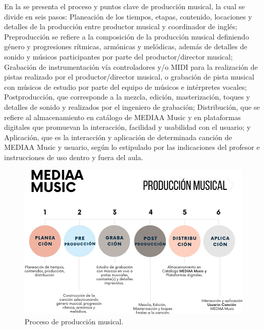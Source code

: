 \documentclass[spanish]{textolivre}
\begin{document}
En la  se presenta el proceso y puntos clave de producción musical, la cual se divide en seis pasos: Planeación de los tiempos, etapas, contenido, locaciones y detalles de la producción entre productor musical y coordinador de inglés; Preproducción se refiere a la composición de la producción musical definiendo género y progresiones rítmicas, armónicas y melódicas, además de detalles de sonido y músicos participantes por parte del productor/director musical; Grabación de instrumentación vía controladores y/o MIDI para la realización de pistas realizado por el productor/director musical, o grabación de pista musical con músicos de estudio por parte del equipo de músicos e intérpretes vocales; Postproducción, que corresponde a la mezcla, edición, masterización, toques y detalles de sonido y realizados por el ingeniero de grabación; Distribución, que se refiere al almacenamiento en catálogo de MEDIAA Music y en plataformas digitales que promuevan la interacción, facilidad y usabilidad con el usuario; y Aplicación, que es la interacción y aplicación de determinada canción de MEDIAA Music y usuario, según lo estipulado por las indicaciones del profesor e instrucciones de uso dentro y fuera del aula.

\begin{figure}[h!]
\centering
\begin{minipage}{.8\textwidth}
 \includegraphics[width=\textwidth]{image2.png}
 \caption{Proceso de producción musical.}
 \label{fig2}
\end{minipage}
\end{figure}
\end{document}
